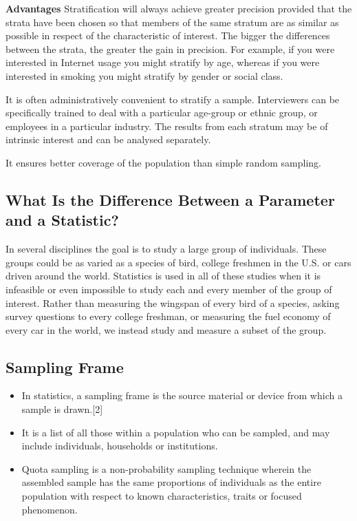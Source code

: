 ﻿\documentclass[]{report}
\begin{document}
\noindent \textbf{Advantages}
Stratification will always achieve greater precision provided that
the strata have been chosen so that members of the same stratum
are as similar as possible in respect of the characteristic of
interest.  The bigger the differences between the strata, the
greater the gain in precision.  For example, if you were
interested in Internet usage you might stratify by age, whereas if
you were interested in smoking you might stratify by gender or
social class.

It is often administratively convenient to stratify a sample.
Interviewers can be specifically trained to deal with a particular
age-group or ethnic group, or employees in a particular industry.
The results from each stratum may be of intrinsic interest and can
be analysed separately.

It ensures better coverage of the population than simple random
sampling.







\subsection*{What Is the Difference Between a Parameter and a Statistic?}

In several disciplines the goal is to study a large group of individuals. These groups could be as varied as a species of bird, college freshmen in the U.S. or cars driven around the world. Statistics is used in all of these studies when it is infeasible or even impossible to study each and every member of the group of interest. Rather than measuring the wingspan of every bird of a species, asking survey questions to every college freshman, or measuring the fuel economy of every car in the world, we instead study and measure a subset of the group.



\subsection{Sampling Frame}
\begin{itemize}
\item In statistics, a sampling frame is the source material or device from which a sample is drawn.[2] 
\item It is a list of all those within a population who can be sampled, and may include individuals, households or institutions.


\item Quota sampling is a non-probability sampling technique wherein the assembled sample has the same proportions of individuals as the entire population with respect to known characteristics, traits or focused phenomenon.
\end{itemize}
\end{document}
